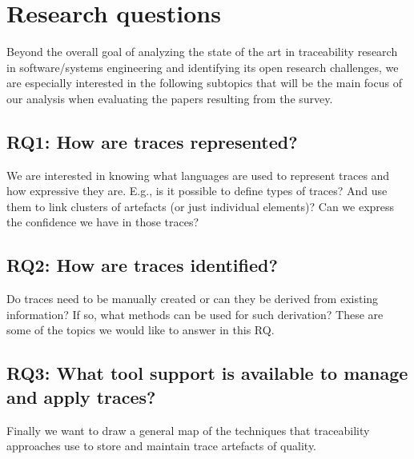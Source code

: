 \section{Research questions}\label{sec:rqs}

Beyond the overall goal of analyzing the state of the art in traceability research in software/systems engineering and identifying its open research challenges, we are especially interested in the following subtopics that will be the main focus of our analysis when evaluating the papers resulting from the survey.

\subsection{RQ1: How are traces represented?}
\label{sec:rq1}
We are interested in knowing what languages are used to represent traces and how expressive they are. E.g., is it possible to define types of traces? And use them to link clusters of artefacts (or just individual elements)? Can we express the confidence we have in those traces?

\subsection{RQ2: How are traces identified?}
\label{sec:rq2}
Do traces need to be manually created or can they be derived from existing information? If so, what methods can be used for such derivation? These are some of the topics we would like to answer in this RQ.

\subsection{RQ3: What tool support is available to manage and apply traces?}
\label{sec:rq3}
Finally we want to draw a general map of the techniques that traceability approaches use to store and maintain trace artefacts of quality.
